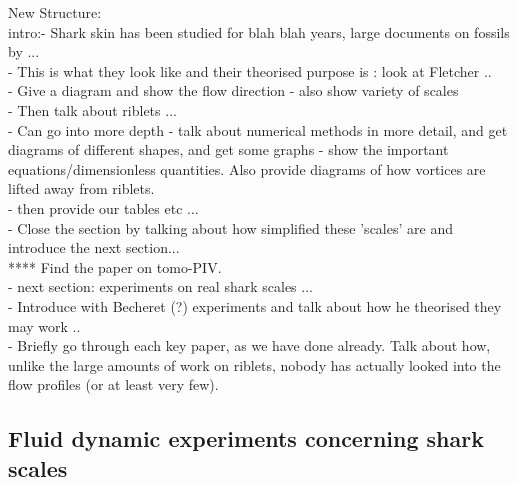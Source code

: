 \documentclass[12pt,oneside,a4paper]{article}
\begin{document}
New Structure:\\
intro:-	Shark skin has been studied for blah blah years, large documents on fossils by ...\\
-	This is what they look like and their theorised purpose is :  look at Fletcher ..\\
-	Give a diagram and show the flow direction - also show variety of scales\\
-	Then talk about riblets ...\\
-	Can go into more depth - talk about numerical methods in more detail, and get diagrams of different shapes, and get some graphs - show the important equations/dimensionless quantities. Also provide diagrams of how vortices are lifted away from riblets.\\
-	then provide our tables etc ...\\
-	Close the section by talking about how simplified these 'scales' are and introduce the next section...\\
****	Find the paper on tomo-PIV.\\
-	next section: experiments on real shark scales ... \\
-	Introduce with Becheret (?) experiments and talk about how he theorised they may work .. \\
-	Briefly go through each key paper, as we have done already. Talk about how, unlike the large amounts of work on riblets, nobody has actually looked into the flow profiles (or at least very few).

\newpage

\subsection{Fluid dynamic experiments concerning shark scales }
\label{section:literatureReview:sharkScaleFluids}
\end{document}
